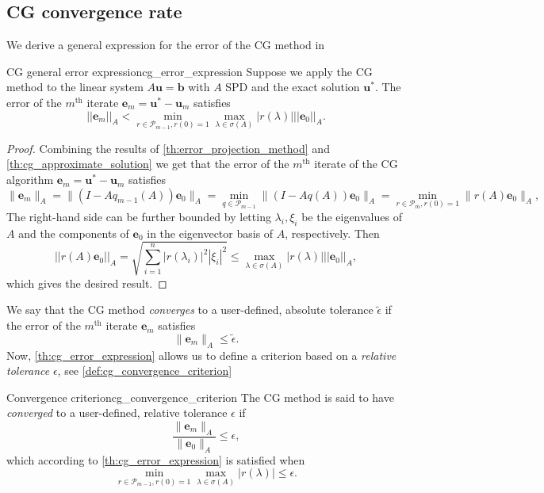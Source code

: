 \subsection{CG convergence rate}\label{sec:cg_convergence_rate}
We derive a general expression for the error of the CG method in 
\begin{fancyth}{CG general error expression}{cg_error_expression}
  Suppose we apply the CG method to the linear system $A\mathbf{u} = \mathbf{b}$ with $A$ SPD and the exact solution $\mathbf{u}^*$. The error of the $m^{\text{th}}$ iterate $\mathbf{e}_m = \mathbf{u}^* - \mathbf{u}_m$ satisfies
  \begin{equation}
    ||\mathbf{e}_m||_A < \min_{r \in \mathcal{P}_{m-1}, r(0) = 1} \max_{\lambda \in \sigma(A)} |r(\lambda)| ||\mathbf{e}_0||_A.
    \label{eq:cg_error_expression}
  \end{equation}
\end{fancyth}
\begin{proof}
  Combining the results of \cref{th:error_projection_method} and \cref{th:cg_approximate_solution} we get that the error of the $m^{\text{th}}$ iterate of the CG algorithm $\mathbf{e}_m = \mathbf{u}^* - \mathbf{u}_m$ satisfies
  \begin{equation}
    \|\mathbf{e}_m\|_A = \|(I - Aq_{m-1}(A))\mathbf{e}_0\|_A = \min_{q \in \mathcal{P}_{m-1}}\|(I - Aq(A))\mathbf{e}_0\|_A = \min_{r \in \mathcal{P}_{m}, r(0) = 1}\|r(A)\mathbf{e}_0\|_A,
    \label{eq:cg_convergence_rate}
  \end{equation}
  The right-hand side can be further bounded by letting $\lambda_i, \xi_i$ be the eigenvalues of $A$ and the components of $\mathbf{e}_0$ in the eigenvector basis of $A$, respectively. Then
  \[
    ||r(A)\mathbf{e}_0||_A = \sqrt{\sum_{i=1}^n |r(\lambda_i)|^2 |\xi_i|^2} \leq \max_{\lambda \in \sigma(A)} |r(\lambda)| ||\mathbf{e}_0||_A,
  \]
  which gives the desired result.
\end{proof}
We say that the CG method \textit{converges} to a user-defined, absolute tolerance $\tilde{\epsilon}$ if the error of the $m^{\text{th}}$ iterate $\mathbf{e}_m$ satisfies
\[
  \|\mathbf{e}_m\|_A \leq \tilde{\epsilon}.
\]
Now, \cref{th:cg_error_expression} allows us to define a criterion based on a \textit{relative tolerance} $\epsilon$, see \cref{def:cg_convergence_criterion}
\begin{fancydef}{Convergence criterion}{cg_convergence_criterion}
  The CG method is said to have \textit{converged} to a user-defined, relative tolerance $\epsilon$ if
  \begin{equation*}
    \frac{\|\mathbf{e}_m\|_A}{\|\mathbf{e}_0\|_A} \leq \epsilon,
  \end{equation*}
  which according to \cref{th:cg_error_expression} is satisfied when
  \begin{equation}
    \min_{r \in \mathcal{P}_{m-1}, r(0) = 1} \max_{\lambda \in \sigma(A)} |r(\lambda)| \leq \epsilon.
    \label{eq:cg_convergence_criterion}
  \end{equation}
\end{fancydef}
